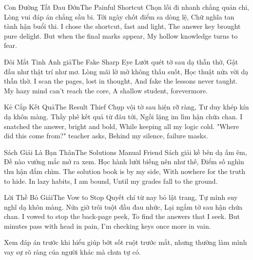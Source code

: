 \begin{tutuyetbox}{Con Đường Tắt Đau Đớn}{The Painful Shortcut}
Chọn lối đi nhanh chẳng quản chi,
Lòng vui đáp án chẳng sầu bi.
Tới ngày chốt điểm sa dòng lệ,
Chữ nghĩa tan tành hận buổi thi.
\tcblower
I chose the shortcut, fast and light,
The answer key brought pure delight.
But when the final marks appear,
My hollow knowledge turns to fear.
\end{tutuyetbox}

\begin{tutuyetbox}{Đôi Mắt Tinh Anh giả}{The Fake Sharp Eye}
Lướt quét tờ sau dạ thẫn thờ,
Gật đầu như thật trí như mơ.
Lòng mãi lờ mờ không thấu suốt,
Học thuật nửa vời dạ thẫn thờ.
\tcblower
I scan the pages, lost in thought,
And fake the lessons never taught.
My hazy mind can't reach the core,
A shallow student, forevermore.
\end{tutuyetbox}

\begin{tutuyetbox}{Kẻ Cắp Kết Quả}{The Result Thief}
Chụp vội tờ sau hiện rỡ ràng,
Tư duy khép kín dạ khôn màng.
Thầy phê kết quả từ đâu tới,
Ngồi lặng im lìm hận chứa chan.
\tcblower
I snatched the answer, bright and bold,
While keeping all my logic cold.
"Where did this come from?" teacher asks,
Behind my silence, failure masks.
\end{tutuyetbox}

\begin{tutuyetbox}{Sách Giải Là Bạn Thân}{The Solutions Manual Friend}
Sách giải kề bên dạ ấm êm,
Đề nào vướng mắc mở ra xem.
Học hành lười biếng nên như thế,
Điểm số nghìn thu hận đắm chìm.
\tcblower
The solution book is by my side,
With nowhere for the truth to hide.
In lazy habits, I am bound,
Until my grades fall to the ground.
\end{tutuyetbox}

\begin{tutuyetbox}{Lời Thề Bỏ Giải}{The Vow to Stop}
Quyết chí từ nay bỏ lật trang,
Tự mình suy nghĩ dạ khôn màng.
Nửa giờ trôi tuột đầu đau nhức,
Lại ngắm tờ sau hận chứa chan.
\tcblower
I vowed to stop the back-page peek,
To find the answers that I seek.
But minutes pass with head in pain,
I'm checking keys once more in vain.
\end{tutuyetbox}

\begin{ghichu}
Xem đáp án trước khi hiểu giúp bớt sốt ruột trước mắt, nhưng thường làm mình vay sự rõ ràng của người khác mà chưa tự có.
\end{ghichu}